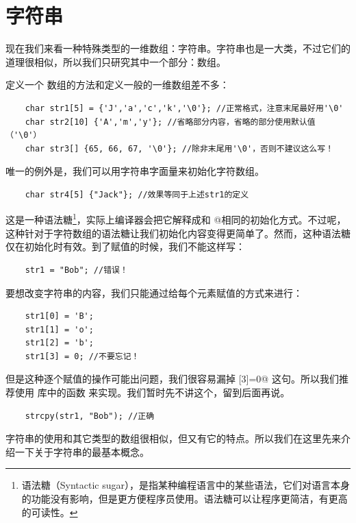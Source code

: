 \section{字符串}
现在我们来看一种特殊类型的一维数组：字符串。字符串也是一大类，不过它们的道理很相似，所以我们只研究其中一个部分：\lstinline@char@ 数组。\par
定义一个 \lstinline@char@ 数组的方法和定义一般的一维数组差不多：
\begin{lstlisting}
    char str1[5] = {'J','a','c','k','\0'}; //正常格式，注意末尾最好用'\0'
    char str2[10] {'A','m','y'}; //省略部分内容，省略的部分使用默认值（'\0'）
    char str3[] {65, 66, 67, '\0'}; //除非末尾用'\0'，否则不建议这么写！
\end{lstlisting}
唯一的例外是，我们可以用字符串字面量来初始化字符数组。
\begin{lstlisting}
    char str4[5] {"Jack"}; //效果等同于上述str1的定义
\end{lstlisting}
这是一种语法糖\footnote{语法糖（Syntactic sugar），是指某种编程语言中的某些语法，它们对语言本身的功能没有影响，但是更方便程序员使用。语法糖可以让程序更简洁，有更高的可读性。}，实际上编译器会把它解释成和 @相同的初始化方式。不过呢，这种针对于字符数组的语法糖让我们初始化内容变得更简单了。然而，这种语法糖仅在初始化时有效。到了赋值的时候，我们不能这样写：
\begin{lstlisting}
    str1 = "Bob"; //错误！
\end{lstlisting}
要想改变字符串的内容，我们只能通过给每个元素赋值的方式来进行：
\begin{lstlisting}
    str1[0] = 'B';
    str1[1] = 'o';
    str1[2] = 'b';
    str1[3] = 0; //不要忘记！
\end{lstlisting}
但是这种逐个赋值的操作可能出问题，我们很容易漏掉 [3]=0@ 这句。所以我们推荐使用 \lstinline@cstring@ 库中的函数 \lstinline@strcpy@ 来实现。我们暂时先不讲这个，留到后面再说。
\begin{lstlisting}
    strcpy(str1, "Bob"); //正确
\end{lstlisting}\par
字符串的使用和其它类型的数组很相似，但又有它的特点。所以我们在这里先来介绍一下关于字符串的最基本概念。
